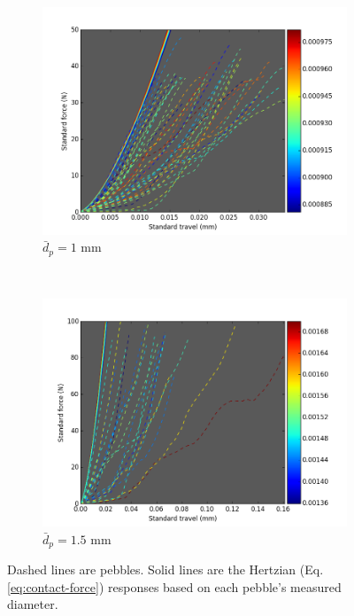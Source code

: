 \begin{figure}
        \centering
        \begin{subfigure}[b]{\doubleimagewidth}
                \includegraphics[width=\textwidth]{chapters/figures/nfri-1mm-data-w-ideal-hertz.png}
                \caption{$\bar{d}_p = 1$ mm}
                \label{fig:nfri-1-exp-colormap}
        \end{subfigure}
        ~
        \begin{subfigure}[b]{\doubleimagewidth}
                \includegraphics[width=\textwidth]{chapters/figures/nfri-1.5mm-data-w-ideal-hertz.png}
                \caption{$\bar{d}_p = 1.5$ mm}
                \label{fig:nfri-1.5-exp-colormap}
        \end{subfigure}
        \caption{Dashed lines are \lit pebbles. Solid lines are the Hertzian (Eq.\ref{eq:contact-force}) responses based on each pebble's measured diameter.}\label{fig:nfri-exp-curves}
\end{figure}


